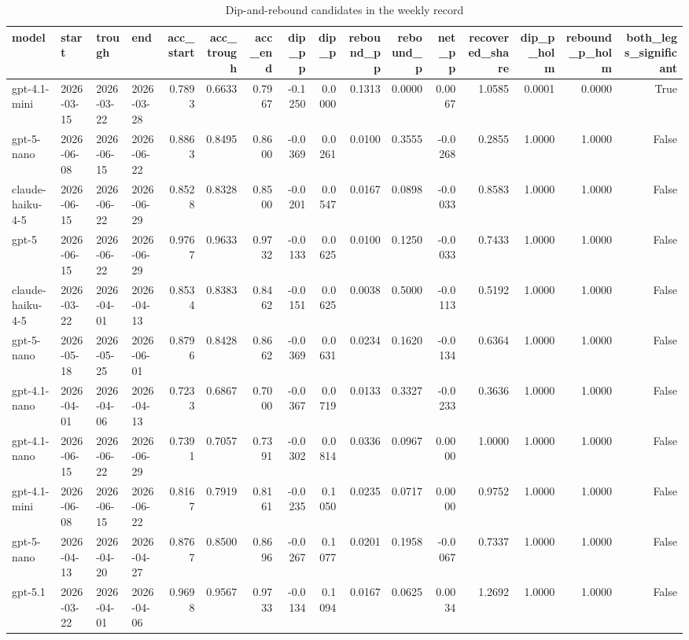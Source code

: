 \begin{table}
\caption{Dip-and-rebound candidates in the weekly record}
\label{tab:table-dip-rebound-candidates}
\begin{tabular}{llllrrrrrrrrrrrr}
\toprule
model & start & trough & end & acc\_start & acc\_trough & acc\_end & dip\_pp & dip\_p & rebound\_pp & rebound\_p & net\_pp & recovered\_share & dip\_p\_holm & rebound\_p\_holm & both\_legs\_significant \\
\midrule
gpt-4.1-mini & 2026-03-15 & 2026-03-22 & 2026-03-28 & 0.7893 & 0.6633 & 0.7967 & -0.1250 & 0.0000 & 0.1313 & 0.0000 & 0.0067 & 1.0585 & 0.0001 & 0.0000 & True \\
gpt-5-nano & 2026-06-08 & 2026-06-15 & 2026-06-22 & 0.8863 & 0.8495 & 0.8600 & -0.0369 & 0.0261 & 0.0100 & 0.3555 & -0.0268 & 0.2855 & 1.0000 & 1.0000 & False \\
claude-haiku-4-5 & 2026-06-15 & 2026-06-22 & 2026-06-29 & 0.8528 & 0.8328 & 0.8500 & -0.0201 & 0.0547 & 0.0167 & 0.0898 & -0.0033 & 0.8583 & 1.0000 & 1.0000 & False \\
gpt-5 & 2026-06-15 & 2026-06-22 & 2026-06-29 & 0.9767 & 0.9633 & 0.9732 & -0.0133 & 0.0625 & 0.0100 & 0.1250 & -0.0033 & 0.7433 & 1.0000 & 1.0000 & False \\
claude-haiku-4-5 & 2026-03-22 & 2026-04-01 & 2026-04-13 & 0.8534 & 0.8383 & 0.8462 & -0.0151 & 0.0625 & 0.0038 & 0.5000 & -0.0113 & 0.5192 & 1.0000 & 1.0000 & False \\
gpt-5-nano & 2026-05-18 & 2026-05-25 & 2026-06-01 & 0.8796 & 0.8428 & 0.8662 & -0.0369 & 0.0631 & 0.0234 & 0.1620 & -0.0134 & 0.6364 & 1.0000 & 1.0000 & False \\
gpt-4.1-nano & 2026-04-01 & 2026-04-06 & 2026-04-13 & 0.7233 & 0.6867 & 0.7000 & -0.0367 & 0.0719 & 0.0133 & 0.3327 & -0.0233 & 0.3636 & 1.0000 & 1.0000 & False \\
gpt-4.1-nano & 2026-06-15 & 2026-06-22 & 2026-06-29 & 0.7391 & 0.7057 & 0.7391 & -0.0302 & 0.0814 & 0.0336 & 0.0967 & 0.0000 & 1.0000 & 1.0000 & 1.0000 & False \\
gpt-4.1-mini & 2026-06-08 & 2026-06-15 & 2026-06-22 & 0.8167 & 0.7919 & 0.8161 & -0.0235 & 0.1050 & 0.0235 & 0.0717 & 0.0000 & 0.9752 & 1.0000 & 1.0000 & False \\
gpt-5-nano & 2026-04-13 & 2026-04-20 & 2026-04-27 & 0.8767 & 0.8500 & 0.8696 & -0.0267 & 0.1077 & 0.0201 & 0.1958 & -0.0067 & 0.7337 & 1.0000 & 1.0000 & False \\
gpt-5.1 & 2026-03-22 & 2026-04-01 & 2026-04-06 & 0.9698 & 0.9567 & 0.9733 & -0.0134 & 0.1094 & 0.0167 & 0.0625 & 0.0034 & 1.2692 & 1.0000 & 1.0000 & False \\

\end{tabular}
\end{table}
